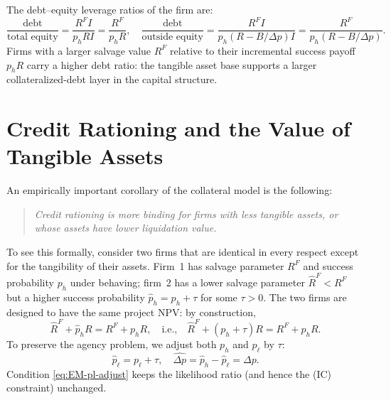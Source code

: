 \documentclass[11pt,a4paper,oneside]{book}
\theoremstyle{plain}
\theoremstyle{definition}
\theoremstyle{remark}
\numberwithin{equation}{chapter}
\begin{document}
The debt--equity leverage ratios of the firm are:
\begin{equation}\label{eq:EM-leverage}
  \frac{\text{debt}}{\text{total equity}} = \frac{R^F I}{p_h R I} = \frac{R^F}{p_h R},
  \quad
  \frac{\text{debt}}{\text{outside equity}} = \frac{R^F I}{p_h(R - B/\Delta p) I} = \frac{R^F}{p_h(R - B/\Delta p)}.
\end{equation}
Firms with a larger salvage value $R^F$ relative to their incremental success payoff $p_h R$ carry a higher debt ratio: the tangible asset base supports a larger collateralized-debt layer in the capital structure.

\section{Credit Rationing and the Value of Tangible Assets}
\label{sec:EM-tangible}

An empirically important corollary of the collateral model is the following:

\begin{quote}\itshape
Credit rationing is more binding for firms with less tangible assets, or whose assets have lower liquidation value.
\end{quote}

To see this formally, consider two firms that are identical in every respect except for the tangibility of their assets.
Firm~1 has salvage parameter $R^F$ and success probability $p_h$ under behaving; firm~2 has a lower salvage parameter $\widehat{R}^F < R^F$ but a higher success probability $\widehat{p}_h = p_h + \tau$ for some $\tau > 0$.
The two firms are designed to have the same project NPV: by construction,
\begin{equation}\label{eq:EM-NPV-invariant}
  \widehat{R}^F + \widehat{p}_h R = R^F + p_h R,
  \quad \text{i.e.,} \quad \widehat{R}^F + (p_h + \tau) R = R^F + p_h R.
\end{equation}
To preserve the agency problem, we adjust both $p_h$ and $p_\ell$ by $\tau$:
\begin{equation}\label{eq:EM-pl-adjust}
  \widehat{p}_\ell = p_\ell + \tau,
  \quad \widehat{\Delta p} = \widehat{p}_h - \widehat{p}_\ell = \Delta p.
\end{equation}
Condition \eqref{eq:EM-pl-adjust} keeps the likelihood ratio (and hence the (IC) constraint) unchanged.
\end{document}
